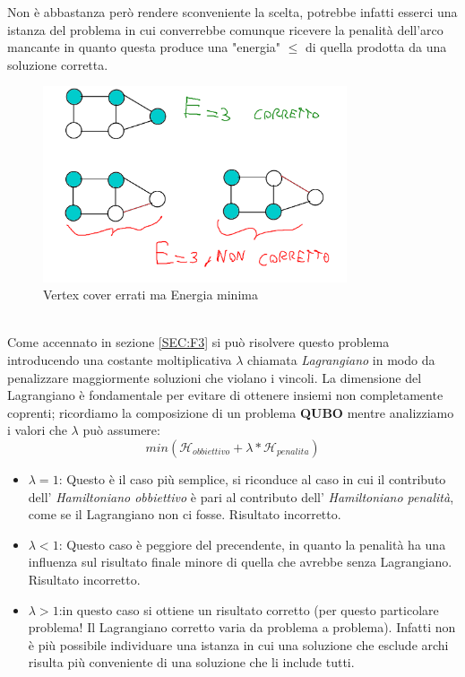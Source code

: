 \documentclass[a4paper]{article}
\begin{document}
Non è abbastanza però rendere sconveniente la scelta, potrebbe infatti esserci una istanza del problema in cui converrebbe comunque ricevere la penalità dell'arco mancante in quanto questa produce una "energia" $\leq$ di quella prodotta da una soluzione corretta.\\
\begin{figure}[!ht]
\centering
\includegraphics[width = 0.8\textwidth]{./img/F4_errato.png}
\caption{Vertex cover errati ma Energia minima} \label{FIG:F4_errato}
\end{figure}\\
Come accennato in sezione \ref{SEC:F3} si può risolvere questo problema introducendo una costante moltiplicativa $\lambda$ chiamata \textit{Lagrangiano} in modo da penalizzare maggiormente soluzioni che violano i vincoli.
La dimensione del Lagrangiano è fondamentale per evitare di ottenere insiemi non completamente coprenti; ricordiamo la composizione di un problema \textbf{QUBO} mentre analizziamo i valori che $\lambda$ può assumere:
$$ min(\mathcal{H}_{obbiettivo} + \lambda * \mathcal{H}_{penalita})$$
\begin{itemize}
	\item $\lambda = 1$: Questo è il caso più semplice, si riconduce al caso in cui il contributo dell' \textit{Hamiltoniano obbiettivo} è pari al contributo dell' \textit{Hamiltoniano penalità}, come se il Lagrangiano non ci fosse. Risultato incorretto.
	\item $\lambda < 1$: Questo caso è peggiore del precendente, in quanto la penalità ha una influenza sul risultato finale minore di quella che avrebbe senza Lagrangiano. Risultato incorretto.
	\item $\lambda > 1$:in questo caso si ottiene un risultato corretto (per questo particolare problema! Il Lagrangiano corretto varia da problema a problema). Infatti non è più possibile individuare una istanza in cui una soluzione che esclude archi risulta più conveniente di una soluzione che li include tutti.
\end{itemize}
\end{document}
